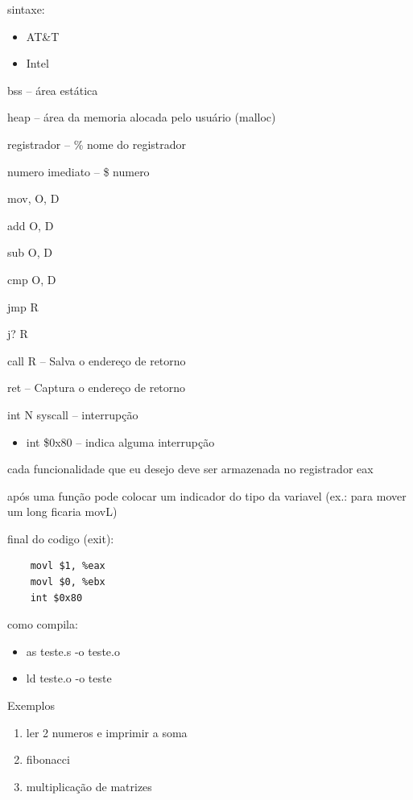 \documentclass[12pt]{article}
\begin{document}
sintaxe:
\begin{itemize}
    \item AT\&T
    \item Intel
\end{itemize}

bss -- área estática

heap -- área da memoria alocada pelo usuário (malloc)

registrador -- \% nome do registrador

numero imediato -- \$ numero


mov, O, D

add O, D

sub O, D

cmp O, D

jmp R

j? R

call R -- Salva o endereço de retorno

ret -- Captura o endereço de retorno 

int N syscall -- interrupção
\begin{itemize}
    \item int \$0x80 -- indica alguma interrupção 
\end{itemize}

cada funcionalidade que eu desejo deve ser armazenada no registrador eax

após uma função pode colocar um indicador do tipo da variavel (ex.: para mover 
um long ficaria movL)

final do codigo (exit):
\begin{verbatim}
    movl $1, %eax
    movl $0, %ebx
    int $0x80 \end{verbatim}

como compila:
\begin{itemize}[label=\$]
    \item as teste.s -o teste.o
    \item ld teste.o -o teste
\end{itemize}

Exemplos
\begin{enumerate}
    \item ler 2 numeros e imprimir a soma
    \item fibonacci
    \item multiplicação de matrizes
\end{enumerate}
\end{document}
